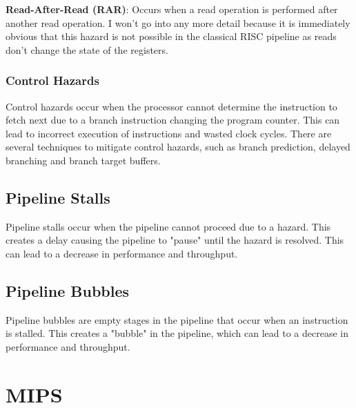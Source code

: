 \textbf{Read-After-Read (RAR)}: Occurs when a read operation is performed after another read operation.\newline
I won't go into any more detail because it is immediately obvious that this hazard is not possible in the classical RISC pipeline as reads don't change the state of the registers.



\subsubsection {Control Hazards}\label{sec:control_hazards}
Control hazards occur when the processor cannot determine the instruction to fetch next due to a branch instruction changing the program counter. This can lead to incorrect execution of instructions and wasted clock cycles. There are several techniques to mitigate control hazards, such as branch prediction, delayed branching and branch target buffers.\cite{pandey2016study}


\subsection {Pipeline Stalls}\label{sec:pipeline_stalls}
Pipeline stalls occur when the pipeline cannot proceed due to a hazard. This creates a delay causing the pipeline to "pause" until the hazard is resolved. This can lead to a decrease in performance and throughput.

\subsection {Pipeline Bubbles}\label{sec:pipeline_bubbles}
Pipeline bubbles are empty stages in the pipeline that occur when an instruction is stalled. This creates a "bubble" in the pipeline, which can lead to a decrease in performance and throughput.


\section {MIPS}\label{sec:mips}
